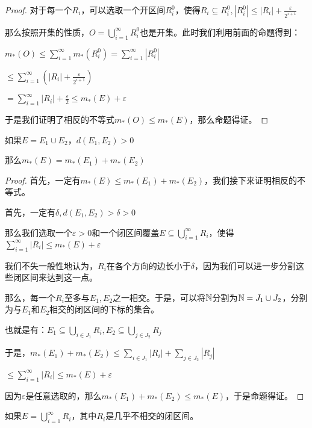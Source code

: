 \documentclass[12pt, a4paper, oneside, UTF8]{ctexbook}
\begin{document}
\begin{para}{0}
\begin{proof}
					对于每一个$R_i$，可以选取一个开区间$R_i^0$，使得$R_i \subseteq R_i^0,|R_i^0| \leqslant |R_i| + \frac{\varepsilon}{2^{i+1}}$
					
					那么按照开集的性质，$O = \bigcup\limits_{i=1}^{\infty} R_i^0$也是开集。此时我们利用前面的命题得到：
					
					$m_*(O) \leqslant \sum\limits_{i=1}^{\infty} m_*(R_i^0) = \sum\limits_{i=1}^{\infty} |R_i^0|$
					
					$\leqslant \sum\limits_{i=1}^{\infty} \left(|R_i| + \frac{\varepsilon}{2^{i+1}}\right)$
					
					$=\sum\limits_{i=1}^{\infty} |R_i| + \frac{\varepsilon}{2} \leqslant m_*(E) + \varepsilon$
					
					于是我们证明了相反的不等式$m_*(O) \leqslant m_*(E)$，那么命题得证。
				\end{proof}
			\point{}
				\begin{proposition}
					如果$E = E_1 \cup E_2$，$d(E_1,E_2) >  0$
					
					那么$m_*(E) = m_*(E_1)+m_*(E_2)$
				\end{proposition}
				\begin{proof}
					首先，一定有$m_*(E) \leqslant m_*(E_1) + m_*(E_2)$，我们接下来证明相反的不等式。
					
					首先，一定有$\delta,d(E_1,E_2) > \delta > 0$
					
					那么我们选取一个$\varepsilon >0$和一个闭区间覆盖$E \subseteq \bigcup\limits_{i=1}^{\infty} R_i$，使得$\sum\limits_{i=1}^{\infty} |R_i| \leqslant m_*(E)+\varepsilon$
					
					我们不失一般性地认为，$R_i$在各个方向的边长小于$\delta$，因为我们可以进一步分割这些闭区间来达到这一点。
					
					那么，每一个$R_i$至多与$E_1,E_2$之一相交。于是，可以将$\mathbb{N}$分割为$\mathbb{N} = J_1 \cup J_2$，分别为与$E_1$和$E_2$相交的闭区间的下标的集合。
					
					也就是有：$E_1 \subseteq \bigcup\limits_{i \in J_1} R_i,E_2 \subseteq \bigcup\limits_{j \in J_2} R_j$
					
					于是，$m_*(E_1)+m_*(E_2) \leqslant \sum\limits_{i\in J_1} |R_i|+\sum\limits_{j\in J_2} |R_j|$
					
					$\leqslant \sum\limits_{i=1}^{\infty} |R_i| \leqslant m_*(E)+\varepsilon$
					
					因为$\varepsilon$是任意选取的，那么$m_*(E_1)+m_*(E_2) \leqslant m_*(E)$，于是命题得证。
				\end{proof}
				\begin{proposition}
					如果$E = \bigcup\limits_{i=1}^{\infty} R_i$，其中$R_i$是几乎不相交的闭区间。
					

\end{proposition}
\end{para}
\end{document}
